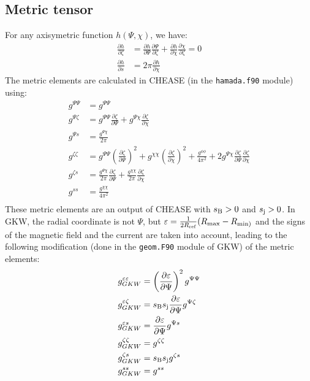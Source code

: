 \documentclass[a4paper,12pt]{article}
\newcommand{\ind}[1]{\ensuremath{_{\rm{#1}}}}
\begin{document}
\subsection{Metric tensor}
For any axisymetric function $h(\Psi,\chi)$, we have:
\begin{align*}
\frac{\partial h}{\partial \zeta}&=\frac{\partial h}{\partial \Psi}\frac{\partial \Psi}{\partial \zeta}+\frac{\partial h}{\partial \chi}\frac{\partial \chi}{\partial \zeta}=0 \\
\frac{\partial h}{\partial s}&=2\pi\frac{\partial h}{\partial \chi}
\end{align*}
The metric elements are calculated in CHEASE (in the \texttt{hamada.f90} module) using:
\begin{align*}
g^{\Psi\Psi}&=g^{\Psi\Psi}\\
g^{\Psi\zeta}&=g^{\Psi\Psi}\frac{\partial\zeta}{\partial \Psi}+g^{\Psi\chi}\frac{\partial\zeta}{\partial \chi}\\
g^{\Psi s}&=\frac{g^{\Psi\chi}}{2\pi}\\
g^{\zeta\zeta}&=g^{\Psi\Psi}\left(\frac{\partial\zeta}{\partial \Psi}\right)^2+g^{\chi\chi}\left(\frac{\partial\zeta}{\partial \chi}\right)^2
	+\frac{g^{\phi\phi}}{4\pi^2}+2g^{\Psi\chi}\frac{\partial\zeta}{\partial \Psi}\frac{\partial\zeta}{\partial \chi}\\
g^{\zeta s}&=\frac{g^{\Psi\chi}}{2\pi}\frac{\partial\zeta}{\partial \Psi}+\frac{g^{\chi\chi}}{2\pi}\frac{\partial\zeta}{\partial \chi}\\
g^{s s}&=\frac{g^{\chi\chi}}{4\pi^2}\\
\end{align*}
These metric elements are an output of CHEASE with $s\ind{B}>0$ and $s\ind{j}>0$. In GKW, the radial coordinate is not $\Psi$, but $\varepsilon=\frac{1}{2R\ind{ref}}(R\ind{max}-R\ind{min)}$
and the signs of the magnetic field and the current are taken into account, leading to the following modification (done in the \texttt{geom.F90} module of GKW) of the metric elements:
\begin{align*}
g^{\varepsilon\varepsilon}_{GKW}&=\left(\frac{\partial\varepsilon}{\partial\Psi}\right)^2g^{\Psi\Psi}\\
g^{\varepsilon\zeta}_{GKW}&=s\ind{B}s\ind{j}\frac{\partial\varepsilon}{\partial\Psi}g^{\Psi\zeta}\\
g^{\varepsilon s}_{GKW}&=\frac{\partial\varepsilon}{\partial\Psi}g^{\Psi s}\\
g^{\zeta\zeta}_{GKW}&=g^{\zeta\zeta}\\
g^{\zeta s}_{GKW}&=s\ind{B}s\ind{j}g^{\zeta s}\\
g^{s s}_{GKW}&=g^{s s}\\
\end{align*}
\end{document}
